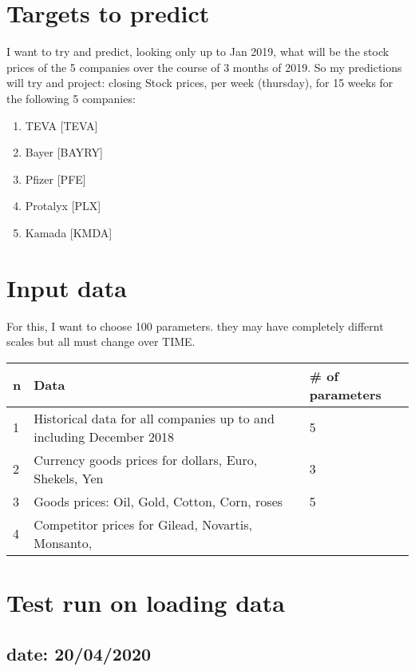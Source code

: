 \documentclass[
]{article}
\providecommand{\tightlist}{%
  \setlength{\itemsep}{0pt}\setlength{\parskip}{0pt}}
\begin{document}
\hypertarget{targets-to-predict}{%
\section{Targets to predict}\label{targets-to-predict}}

I want to try and predict, looking only up to Jan 2019, what will be the
stock prices of the 5 companies over the course of 3 months of 2019. So
my predictions will try and project: closing Stock prices, per week
(thursday), for 15 weeks for the following 5 companies:

\begin{enumerate}
\def\labelenumi{\arabic{enumi}.}
\tightlist
\item
  TEVA {[}TEVA{]}
\item
  Bayer {[}BAYRY{]}
\item
  Pfizer {[}PFE{]}
\item
  Protalyx {[}PLX{]}
\item
  Kamada {[}KMDA{]}
\end{enumerate}

\hypertarget{input-data}{%
\section{Input data}\label{input-data}}

For this, I want to choose 100 parameters. they may have completely
differnt scales but all must change over TIME.

\begin{longtable}[]{@{}lll@{}}
\toprule
n & Data & \# of parameters\tabularnewline
\midrule
\endhead
1 & Historical data for all companies up to and including December 2018
& 5\tabularnewline
2 & Currency goods prices for dollars, Euro, Shekels, Yen &
3\tabularnewline
3 & Goods prices: Oil, Gold, Cotton, Corn, roses & 5\tabularnewline
4 & Competitor prices for Gilead, Novartis, Monsanto, &\tabularnewline
\bottomrule
\end{longtable}

\hypertarget{test-run-on-loading-data}{%
\section{Test run on loading data}\label{test-run-on-loading-data}}

\hypertarget{date-20042020}{%
\subsection{date: 20/04/2020}\label{date-20042020}}
\end{document}
